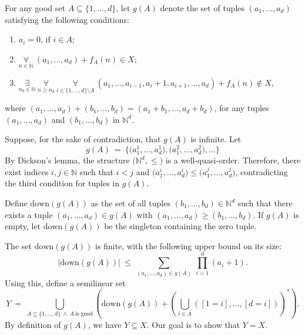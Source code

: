 \documentclass[12pt]{article}
\begin{document}
	\medskip
	
	For any good set \(A \subseteq \{1, \ldots, d\}\), let \(g(A)\) denote the
	set of tuples \((a_{1}, \ldots, a_{d})\) satisfying the following conditions:
	\begin{enumerate}
		\item \(a_{i} = 0\), if \(i \in A\);
		\item \(\underset{n \in \mathbb{N}}{\forall} \ (a_{1}, \ldots, a_{d}) +
		      f_{A}(n) \in X\);
		\item \(\underset{n_{0} \in \mathbb{N}}{\exists} \ \underset{n \geqslant
		      n_{0}}{\forall} \ \underset{i \in \{1, \ldots, d\} \setminus A}
		      {\forall} \ (a_{1}, \ldots, a_{i - 1}, a_{i} + 1, a_{i + 1},
		      \ldots, a_{d}) + f_{A}(n) \notin X\),
	\end{enumerate}
	where \((a_{1}, \ldots, a_{d}) + (b_{1}, \ldots, b_{d}) = (a_{1} + b_{1},
	\ldots, a_{d} + b_{d})\), for any tuples \((a_{1}, \ldots, a_{d})\) and
	\((b_{1}, \ldots, b_{d})\) in \(\mathbb{N}^{d}\).
	
	\medskip
	
	Suppose, for the sake of contradiction, that \(g(A)\) is infinite. Let
	\[ g(A) \ = \ \big\{ \big( a_{1}^{1}, \ldots, a_{d}^{1} \big), \big(
	a_{1}^{2}, \ldots, a_{d}^{2} \big), \ldots \big\} \]
	By Dickson's lemma, the structure \(\big( \mathbb{N}^{d}, \leqslant \!\!
	\big)\) is a well-quasi-order.  Therefore, there exist indices \(i, j \in
	\mathbb{N}\) such that \(i < j\) and \(\big( a_{1}^{i}, \ldots, a_{d}^{i}
	\big) \leqslant \big( a_{1}^{j}, \ldots, a_{d}^{j} \big)\), contradicting
	the third condition for tuples in \(g(A)\).
	
	\medskip
	
	Define \(\text{down}(g(A))\) as the set of all tuples \((b_{1}, \ldots,
	b_{d}) \in \mathbb{N}^{d}\) such that there exists a tuple \((a_{1}, \ldots,
	a_{d}) \in g(A)\) with \((a_{1}, \ldots, a_{d}) \geqslant (b_{1}, \ldots,
	b_{d})\). If \(g(A)\) is empty, let \(\text{down}(g(A))\) be the singleton
	containing the zero tuple.
	
	\medskip
	
	The set \(\text{down}(g(A))\) is finite, with the following upper bound on
	its size:
	\[ |\text{down}(g(A))| \ \leqslant \ \sum\limits_{(a_{1}, \ldots, a_{d}) \in
	g(A)} \ \prod\limits_{i = 1}^{d} (a_{i} + 1) \text{.} \]
	Using this, define a semilinear set
	\[ Y \ = \ \bigcup_{A \subseteq \{1, \ldots, d\} \ \wedge \ A \
	\text{is good}} \left( \text{down}(g(A)) + \left( \bigcup_{i \in A}
	([1 = i], \ldots, [d = i]) \right)^{\ast} \right) \text{.} \]
	By definition of \(g(A)\), we have \(Y \subseteq X\). Our goal is to show
	that \(Y = X\).
	
\end{document}

